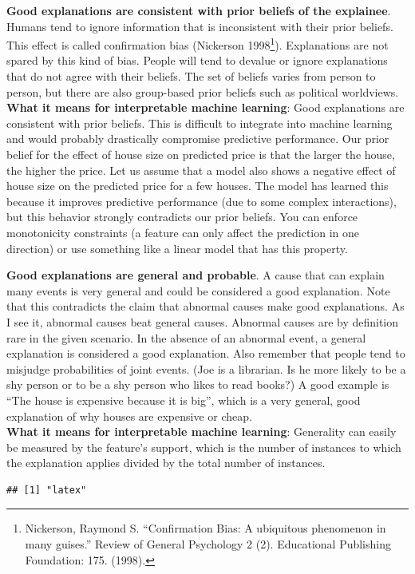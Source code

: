\documentclass[
  11pt,
]{scrbook}
\begin{document}
\textbf{Good explanations are consistent with prior beliefs of the explainee}.
Humans tend to ignore information that is inconsistent with their prior beliefs.
This effect is called confirmation bias (Nickerson 1998\footnote{Nickerson, Raymond S. ``Confirmation Bias: A ubiquitous phenomenon in many guises.'' Review of General Psychology 2 (2). Educational Publishing Foundation: 175. (1998).}).
Explanations are not spared by this kind of bias.
People will tend to devalue or ignore explanations that do not agree with their beliefs.
The set of beliefs varies from person to person, but there are also group-based prior beliefs such as political worldviews.\\
\textbf{What it means for interpretable machine learning}:
Good explanations are consistent with prior beliefs.
This is difficult to integrate into machine learning and would probably drastically compromise predictive performance.
Our prior belief for the effect of house size on predicted price is that the larger the house, the higher the price.
Let us assume that a model also shows a negative effect of house size on the predicted price for a few houses.
The model has learned this because it improves predictive performance (due to some complex interactions), but this behavior strongly contradicts our prior beliefs.
You can enforce monotonicity constraints (a feature can only affect the prediction in one direction) or use something like a linear model that has this property.

\textbf{Good explanations are general and probable}.
A cause that can explain many events is very general and could be considered a good explanation.
Note that this contradicts the claim that abnormal causes make good explanations.
As I see it, abnormal causes beat general causes.
Abnormal causes are by definition rare in the given scenario.
In the absence of an abnormal event, a general explanation is considered a good explanation.
Also remember that people tend to misjudge probabilities of joint events.
(Joe is a librarian. Is he more likely to be a shy person or to be a shy person who likes to read books?)
A good example is ``The house is expensive because it is big'', which is a very general, good explanation of why houses are expensive or cheap.\\
\textbf{What it means for interpretable machine learning}:
Generality can easily be measured by the feature's support, which is the number of instances to which the explanation applies divided by the total number of instances.

\begin{verbatim}
## [1] "latex"
\end{verbatim}
\end{document}
